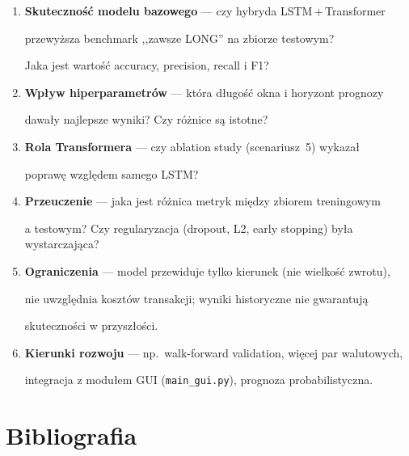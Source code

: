 \documentclass[12pt,a4paper]{report}
\begin{document}
\begin{enumerate}

    \item \textbf{Skuteczność modelu bazowego} --- czy hybryda LSTM\,+\,Transformer

          przewyższa benchmark ,,zawsze LONG'' na zbiorze testowym?

          Jaka jest wartość accuracy, precision, recall i F1?

    \item \textbf{Wpływ hiperparametrów} --- która długość okna i horyzont prognozy

          dawały najlepsze wyniki? Czy różnice są istotne?

    \item \textbf{Rola Transformera} --- czy ablation study (scenariusz~5) wykazał

          poprawę względem samego LSTM?

    \item \textbf{Przeuczenie} --- jaka jest różnica metryk między zbiorem treningowym

          a testowym? Czy regularyzacja (dropout, L2, early stopping) była wystarczająca?

    \item \textbf{Ograniczenia} --- model przewiduje tylko kierunek (nie wielkość zwrotu),

          nie uwzględnia kosztów transakcji; wyniki historyczne nie gwarantują

          skuteczności w przyszłości.

    \item \textbf{Kierunki rozwoju} --- np.\ walk-forward validation, więcej par walutowych,

          integracja z modułem GUI (\texttt{main\_gui.py}), prognoza probabilistyczna.

\end{enumerate}




\chapter{Bibliografia}

\end{document}
